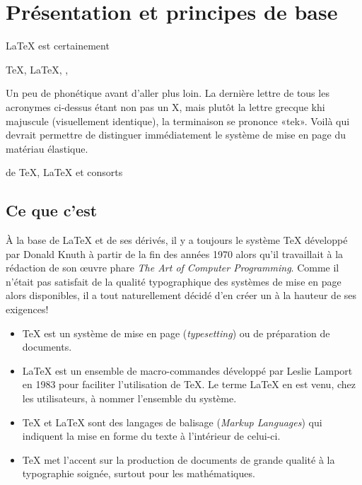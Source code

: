 \chapter{Présentation et principes de base}
\label{chap:presentation}


{\LaTeX} est certainement

{\TeX}, {\LaTeX}, {\XeLaTeX}, {\LuaTeX}

Un peu de phonétique avant d'aller plus loin. La dernière lettre de
tous les acronymes ci-dessus étant non pas un X, mais plutôt la lettre
grecque khi majuscule (visuellement identique), la terminaison se
prononce «tek». Voilà qui devrait permettre de distinguer
immédiatement le système de mise en page du matériau élastique.

de {\TeX}, {\LaTeX} et consorts

\section{Ce que c'est}
\label{sec:presentation:c-est}

À la base de {\LaTeX} et de ses dérivés, il y a toujours le système
{\TeX} développé par Donald Knuth à partir de la fin des années 1970
alors qu'il travaillait à la rédaction de son {\oe}uvre phare
\emph{The Art of Computer Programming}. Comme il n'était pas satisfait
de la qualité typographique des systèmes de mise en page alors
disponibles, il a tout naturellement décidé d'en créer un à la hauteur
de ses exigences!

\begin{itemize}
\item {\TeX} est un système de mise en page (\emph{typesetting}) ou de
  préparation de documents.
\item {\LaTeX} est un ensemble de macro-commandes développé par Leslie
  Lamport en 1983 pour faciliter l'utilisation de {\TeX}. Le terme
  {\LaTeX} en est venu, chez les utilisateurs, à nommer l'ensemble du
  système.
\item {\TeX} et {\LaTeX} sont des langages de balisage (\emph{Markup
    Languages}) qui indiquent la mise en forme du texte à l'intérieur
  de celui-ci.
\item {\TeX} met l'accent sur la production de documents de grande
  qualité à la typographie soignée, surtout pour les mathématiques.
\end{itemize}

